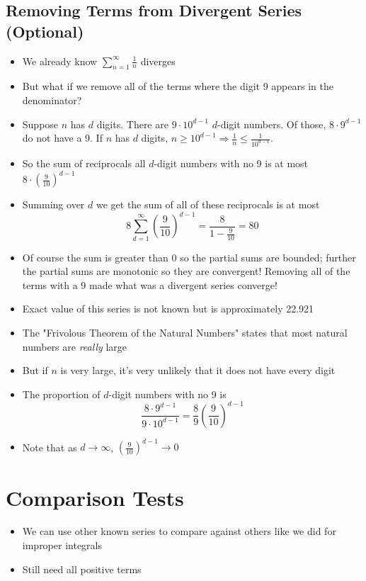 \documentclass[letterpaper, 11pt, openany]{book}
\theoremstyle{mytheoremstyle}
\theoremstyle{myexamplestyle}
\begin{document}
\subsection{Removing Terms from Divergent Series (Optional)}
\begin{itemize}
    \item We already know $\displaystyle \sum_{n=1}^{\infty} \frac{1}{n}$ diverges
    \item But what if we remove all of the terms where the digit 9 appears in the denominator?
    \item Suppose $n$ has $d$ digits. There are $9 \cdot 10^{d-1}$ $d$-digit numbers. Of those, $8 \cdot 9^{d-1}$ do not have a 9. If \(n\) has \(d\) digits, \(n \geq 10^{d-1} \Rightarrow \frac{1}{n} \leq \frac{1}{10^{d-1}}\).
    \item So the sum of reciprocals all $d$-digit numbers with no 9 is at most $8\cdot \left( \frac{9}{10} \right)^{d-1}$
    \item Summing over $d$ we get the sum of all of these reciprocals is at most
    \[8 \sum_{d=1}^{\infty} \left( \frac{9}{10} \right)^{d-1} = \frac{8}{1 - \frac{9}{10}} = 80\]
    \item Of course the sum is greater than 0 so the partial sums are bounded; further the partial sums are monotonic so they are convergent! Removing all of the terms with a 9 made what was a divergent series converge!
    \item Exact value of this series is not known but is approximately 22.921
    \item The "Frivolous Theorem of the Natural Numbers" states that most natural numbers are \textit{really} large \faSmile
    \item But if $n$ is very large, it's very unlikely that it does not have every digit
    \item The proportion of $d$-digit numbers with no 9 is
    \[\frac{8 \cdot 9^{d-1}}{9 \cdot 10^{d-1}} = \frac{8}{9} \left( \frac{9}{10} \right)^{d-1}\]
    \item Note that as $d \to \infty$, $\left( \frac{9}{10} \right)^{d-1} \to 0$
\end{itemize}

\section{Comparison Tests}
\setcounter{figure}{0}
\begin{itemize}
    \item We can use other known series to compare against others like we did for improper integrals
    \item Still need all positive terms
\end{itemize}
\end{document}
